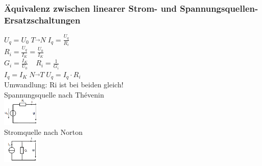 \subsubsection{Äquivalenz zwischen linearer Strom- und Spannungsquellen-Ersatzschaltungen}
\begin{multicols}{3}
	$ U_q = U_0 \; T \overrightarrow{} N \; I_{q} = \frac{U_{q}}{R_{i}} $\\
	$ R_i = \frac{U_q}{I_K} = \frac{U_0}{I_K} $\\
	$ G_i = \frac{I_K}{U_0}\ \ \ \ \ R_i = \frac{1}{G_i}$\\
	$ I_q = I_K \; N \overrightarrow{} T \; U_q = I_q \cdot R_i $\\
	Umwandlung: Ri ist bei beiden gleich!\\
	Spannungsquelle nach Thévenin\\
	\includegraphics[width=0.13\textwidth]{pics/dcnet/ersatz_spannung}\\
	Stromquelle nach Norton\\
	\includegraphics[width=0.13\textwidth]{pics/dcnet/ersatz_strom}\\

\end{multicols}